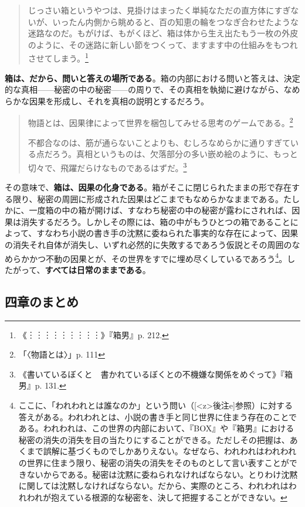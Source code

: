 \documentclass[9pt,b5j,twoside,twocolumn]{utarticle}
\begin{document}
\begin{quotation}
じっさい箱というやつは、見掛けはまったく単純なただの直方体にすぎないが、いったん内側から眺めると、百の知恵の輪をつなぎ合わせたような迷路なのだ。もがけば、もがくほど、箱は体から生え出たもう一枚の外皮のように、その迷路に新しい節をつくって、ますます中の仕組みをもつれさせてしまう。\footnote{《︙︙︙︙︙︙︙︙︙》『箱男』p. 212.}	
\end{quotation}

\textbf{箱は、だから、問いと答えの場所である}。箱の内部における問いと答えは、決定的な真相------秘密の中の秘密------の周りで、その真相を執拗に避けながら、なめらかな因果を形成し、それを真相の説明とするだろう。

\begin{quotation}
物語とは、因果律によって世界を梱包してみせる思考のゲームである。\footnote{「〈物語とは〉」p. 111}

不都合なのは、筋が通らないことよりも、むしろなめらかに通りすぎている点だろう。真相というものは、欠落部分の多い嵌め絵のように、もっと切々で、飛躍だらけなものであるはずだ。\footnote{《書いているぼくと　書かれているぼくとの不機嫌な関係をめぐって》『箱男』p. 131.}
\end{quotation}

その意味で、\textbf{箱は、因果の化身である}。箱がそこに閉じられたままの形で存在する限り、秘密の周囲に形成された因果はどこまでもなめらかなままである。たしかに、一度箱の中の箱が開けば、すなわち秘密の中の秘密が露わにされれば、因果は消失するだろう。しかしその際には、箱の中がもうひとつの箱であることによって、すなわち小説の書き手の沈黙に委ねられた事実的な存在によって、因果の消失それ自体が消失し、いずれ必然的に失敗するであろう仮説とその周囲のなめらかかつ不動の因果とが、その世界をすでに埋め尽くしているであろう\footnote{ここに、「われわれとは誰なのか」という問い（[\pbox<z>{後注e}]参照）に対する答えがある。われわれとは、小説の書き手と同じ世界に住まう存在のことである。われわれは、この世界の内部において、『BOX』や『箱男』における秘密の消失の消失を目の当たりにすることができる。ただしその把握は、あくまで誤解に基づくものでしかありえない。なぜなら、われわれはわれわれの世界に住まう限り、秘密の消失の消失をそのものとして言い表すことができないからである。秘密は沈黙に委ねられなければならない。とりわけ沈黙に関しては沈黙しなければならない。だから、実際のところ、われわれはわれわれが抱えている根源的な秘密を、決して把握することができない。}。したがって、\textbf{すべては日常のままである}。

\subsection*{四章のまとめ}
\end{document}
